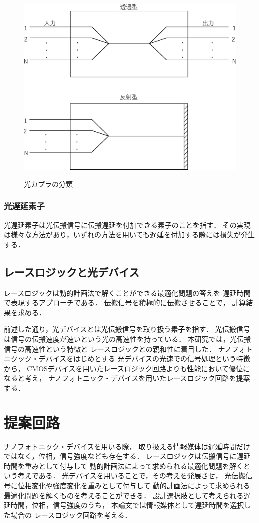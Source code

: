 \begin{figure}[t!]
\begin{center}
{\includegraphics[keepaspectratio, scale=0.4]{fig/3/lcoup4.eps}
\label{fig:lcoup4}
}
\caption{光カプラの分類}
\label{fig:lcoup}
\end{center}
\end{figure}

\subsubsection{光遅延素子}
光遅延素子は光伝搬信号に伝搬遅延を付加できる素子のことを指す．
その実現は様々な方法があり，いずれの方法を用いても遅延を付加する際には損失が発生する．

\subsection{レースロジックと光デバイス}
レースロジックは動的計画法で解くことができる最適化問題の答えを
遅延時間で表現するアプローチである．
伝搬信号を積極的に伝搬させることで，
計算結果を求める．

前述した通り，光デバイスとは光伝搬信号を取り扱う素子を指す．
光伝搬信号は信号の伝搬速度が速いという光の高速性を持っている．
本研究では，光伝搬信号の高速性という特徴と
レースロジックとの親和性に着目した．
ナノフォトニクック・デバイスをはじめとする
光デバイスの光速での信号処理という特徴から，
CMOSデバイスを用いたレースロジック回路よりも性能において優位になると考え，
ナノフォトニック・デバイスを用いたレースロジック回路を提案する．

\section{提案回路}
ナノフォトニック・デバイスを用いる際，
取り扱える情報媒体は遅延時間だけではなく，位相，信号強度なども存在する．
レースロジックは伝搬信号に遅延時間を重みとして付与して
動的計画法によって求められる最適化問題を解くという考えである．
光デバイスを用いることで，その考えを発展させ，
光伝搬信号に位相変化や強度変化を重みとして付与して
動的計画法によって求められる最適化問題を解くものを考えることができる．
設計選択肢として考えられる遅延時間，位相，信号強度のうち，
本論文では情報媒体として遅延時間を選択した場合の
レースロジック回路を考える．

